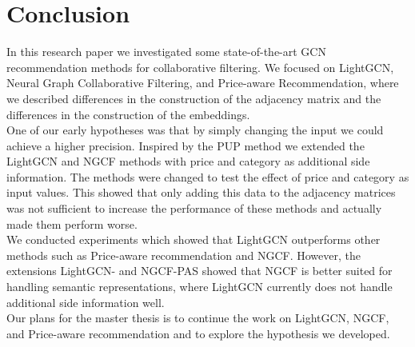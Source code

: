\section{Conclusion}
In this research paper we investigated some state-of-the-art GCN recommendation methods for collaborative filtering.
We focused on LightGCN, Neural Graph Collaborative Filtering, and Price-aware Recommendation, where we described differences in the construction of the adjacency matrix and the differences in the construction of the embeddings.
\\
One of our early hypotheses was that by simply changing the input we could achieve a higher precision.
Inspired by the PUP method we extended the LightGCN and NGCF methods with price and category as additional side information.
The methods were changed to test the effect of price and category as input values.
This showed that only adding this data to the adjacency matrices was not sufficient to increase the performance of these methods and actually made them perform worse.
\\
We conducted experiments which showed that LightGCN outperforms other methods such as Price-aware recommendation and NGCF.
However, the extensions LightGCN- and NGCF-PAS showed that NGCF is better suited for handling semantic representations, where LightGCN currently does not handle additional side information well.
\\
Our plans for the master thesis is to continue the work on LightGCN, NGCF, and Price-aware recommendation and to explore the hypothesis we developed.
